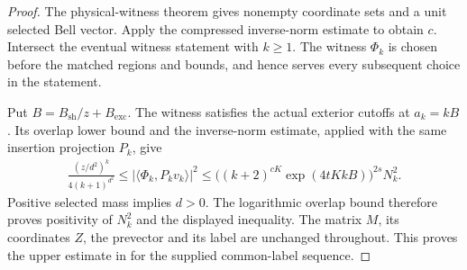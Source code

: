 \begin{proof}\leanok
    The physical-witness theorem gives nonempty coordinate sets and a unit
    selected Bell vector. Apply the compressed inverse-norm estimate to
    obtain $c$. Intersect the eventual witness statement with $k\ge1$.
    The witness $\Phi_k$ is chosen before the matched regions and bounds,
    and hence serves every subsequent choice in the statement.

    Put $B=B_{\mathrm{sh}}/z+B_{\mathrm{exc}}$. The witness satisfies the
    actual exterior cutoffs at $a_k=kB$. Its overlap lower bound and the
    inverse-norm estimate, applied with the same insertion projection $P_k$,
    give
    \begin{align*}
        \frac{(z/d^2)^k}{4(k+1)^{d^2}}
        \le |\langle\Phi_k,P_kv_k\rangle|^2
        \le \bigl((k+2)^{cK}\exp(4tKkB)\bigr)^{2s}N_k^2.
    \end{align*}
    Positive selected mass implies $d>0$. The logarithmic overlap bound
    therefore proves positivity of $N_k^2$ and the displayed inequality.
    The matrix $M$, its coordinates $Z$, the prevector and its label are
    unchanged throughout. This proves the upper estimate in
    \cite[Section~8, lines 153--163 and 332--381]{OpenAI2026AreaLaw}
    for the supplied common-label sequence.
\end{proof}
